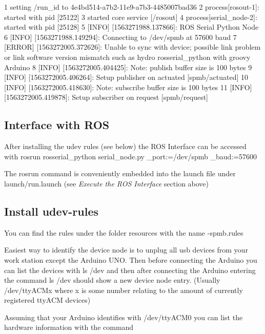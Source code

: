 \begin{DoxyCode}
1 setting /run\_id to 4e4bd514-a7b2-11e9-a7b3-4485007bad36
2 process[rosout-1]: started with pid [25122]
3 started core service [/rosout]
4 process[serial\_node-2]: started with pid [25128]
5 [INFO] [1563271988.137866]: ROS Serial Python Node
6 [INFO] [1563271988.149294]: Connecting to /dev/spmb at 57600 baud
7 [ERROR] [1563272005.372626]: Unable to sync with device; possible link problem or link software version
       mismatch such as hydro rosserial\_python with groovy Arduino
8 [INFO] [1563272005.404425]: Note: publish buffer size is 100 bytes
9 [INFO] [1563272005.406264]: Setup publisher on actuated [spmb/actuated]
10 [INFO] [1563272005.418630]: Note: subscribe buffer size is 100 bytes
11 [INFO] [1563272005.419878]: Setup subscriber on request [spmb/request]
\end{DoxyCode}


\subsection*{Interface with R\+OS}


\begin{DoxyItemize}
\item After installing the udev rules (see below) the R\+OS Interface can be accessed with {\ttfamily rosrun rosserial\+\_\+python serial\+\_\+node.\+py \+\_\+port\+:=/dev/spmb \+\_\+baud\+:=57600}
\item The {\ttfamily rosrun} command is conveniently embedded into the launch file under {\ttfamily launch/run.\+launch} (see {\itshape Execute the R\+OS Interface} section above)
\end{DoxyItemize}

\subsection*{Install udev-\/rules}


\begin{DoxyItemize}
\item You can find the rules under the folder {\ttfamily resources} with the name {-\/spmb.\+rules}
\item Easiest way to identify the device node is to unplug all usb devices from your work station except the Arduino U\+NO. Then before connecting the Arduino you can list the devices with {\ttfamily ls /dev} and then after connecting the Arduino entering the command {\ttfamily ls /dev} should show a new device node entry. (Usually {\ttfamily /dev/tty\+A\+C\+Mx} where x is some number relating to the amount of currently registered tty\+A\+CM devices)
\item Assuming that your Arduino identifies with {\ttfamily /dev/tty\+A\+C\+M0} you can list the hardware information with the command
\end{DoxyItemize}


